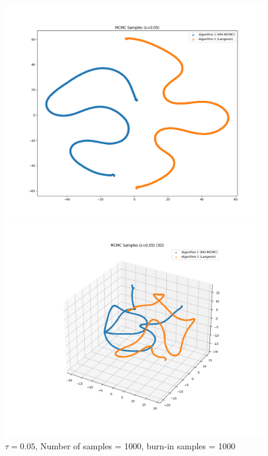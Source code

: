 \documentclass[a4paper,12pt]{article}
\begin{document}
\begin{figure}[H]
  \centering
  \begin{minipage}{0.48\textwidth}
    \includegraphics[width=\linewidth]{TASK-0-1/images/samples_eps0.05_n1000_burn1000_tsne_2d.png}
  \end{minipage}
  \hfill
  \begin{minipage}{0.48\textwidth}
    \includegraphics[width=\linewidth]{TASK-0-1/images/samples_eps0.05_n1000_burn1000_tsne_3d.png}
  \end{minipage}
  \caption{$\tau = 0.05$, Number of samples = 1000, burn-in samples = 1000}
\end{figure}
\end{document}
